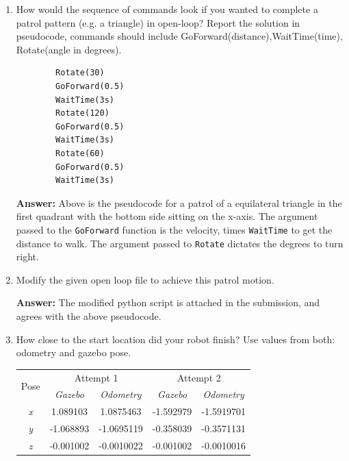 \documentclass[12pt]{article}
\begin{document}
\begin{enumerate}
    \item How would the sequence of commands look if you wanted to complete a patrol pattern (e.g. a triangle) in open-loop? Report the solution in pseudocode, commands should include GoForward(distance),WaitTime(time), Rotate(angle in degrees).
    
    \vspace{-3ex}
    \begin{verbatim}
        Rotate(30)
        GoForward(0.5)
        WaitTime(3s)
        Rotate(120)
        GoForward(0.5)
        WaitTime(3s)
        Rotate(60)
        GoForward(0.5)
        WaitTime(3s)
    \end{verbatim}
    \vspace{-4ex}

    \textbf{Answer: }Above is the pseudocode for a patrol of a equilateral triangle in the first quadrant with the bottom side sitting on the x-axis. The argument passed to the \texttt{GoForward} function is the velocity, times \texttt{WaitTime} to get the distance to walk. The argument passed to \texttt{Rotate} dictates the degrees to turn right.

    \item Modify the given open loop file to achieve this patrol motion.
    
    \textbf{Answer: }The modified python script is attached in the submission, and agrees with the above pseudocode.

    \item How close to the start location did your robot finish? Use values from both: odometry and gazebo pose.
    
    \begin{table}[H]
    \centering
    \begin{tabular}{|c|cc|cc|}
    \hline
    \multirow{2}{*}{Pose} & \multicolumn{2}{c|}{Attempt 1}                  & \multicolumn{2}{c|}{Attempt 2}                  \\ \cline{2-5} 
                                   & \multicolumn{1}{c|}{\textit{Gazebo}} & \textit{Odometry} & \multicolumn{1}{c|}{\textit{Gazebo}} & \textit{Odometry} \\ \hline
    \textit{x} & \multicolumn{1}{c|}{1.089103}  & 1.0875463  & \multicolumn{1}{c|}{-1.592979} & -1.5919701 \\ \hline
    \textit{y} & \multicolumn{1}{c|}{-1.068893} & -1.0695119 & \multicolumn{1}{c|}{-0.358039} & -0.3571131 \\ \hline
    \textit{z} & \multicolumn{1}{c|}{-0.001002} & -0.0010022 & \multicolumn{1}{c|}{-0.001002} & -0.0010016 \\ \hline
    \end{tabular}
    \end{table}
    \vspace{-2ex}
    

\end{enumerate}
\end{document}
